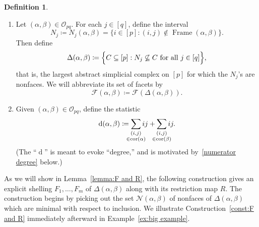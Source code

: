 \documentclass[noamsfonts,10pt]{amsart}
\newcommand{\NN}{\mathcal{N}}
\newcommand{\al}{\alpha}
\newcommand{\be}{\beta}
\DeclareMathOperator{\Fr}{Frame}
\renewcommand{\O}{\mathcal{O}}
\newcommand{\F}{\mathcal{F}}
\renewcommand{\d}{\operatorname{d}}
\DeclareMathOperator{\cor}{cor}
\newcommand{\1}{\mathbf{1}}
\theoremstyle{plain}
\theoremstyle{definition}
\newtheorem{dfn}[theorem]{Definition}
\numberwithin{equation}{section}
\begin{document}
\begin{dfn}
\begin{enumerate}
        \item \label{Delta(alpha,beta)} Let $(\al, \be) \in \O_{pq}$.
        For each $j \in [q]$, define the interval
        \[
            N_j \coloneqq N_j(\al, \be) =  \Big\{ i \in [p] : (i,j) \notin \Fr(\al,\be) \Big\}.
        \]
        Then define 
        \[
            \Delta(\al,\be) \coloneqq \Big\{ C \subseteq [p] : N_j \not\subseteq C \textup{ for all } j \in [q] \Big\},
        \]
        that is, the largest abstract simplicial complex on $[p]$ for which the $N_j$'s are nonfaces.
        We will abbreviate its set of facets by
        \[
            \F(\al,\be) \coloneqq \F(\Delta(\al,\be)).
        \]

        \item \label{d definition} Given $(\al, \be) \in \O_{pq}$, define the statistic
        \[
            \d(\al, \be)
            \coloneqq \sum_{\mathclap{\substack{(i,j) \\ \in \cor(\al)}}} ij + \sum_{\mathclap{\substack{(i,j) \\ \in \cor(\be)}}} ij.
        \]
        (The ``$\d$'' is meant to evoke ``degree,'' and is motivated by~\eqref{numerator degree} below.)
    \end{enumerate}

\end{dfn}

As we will show in Lemma~\ref{lemma:F and R}, the following construction gives an explicit shelling $F_1, \ldots, F_m$ of $\Delta(\al,\be)$ along with its restriction map $R$.
The construction begins by picking out the set $\NN(\al,\be)$ of nonfaces of $\Delta(\al,\be)$ which are minimal with respect to inclusion.
We illustrate Construction~\ref{const:F and R} immediately afterward in Example~\ref{ex:big example}.
\end{document}
